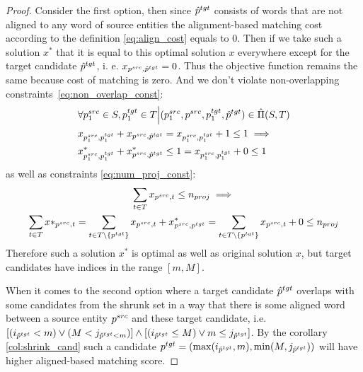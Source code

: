 \begin{proof}
    Consider the first option, then since \( \hat{p}^{tgt}  \) consists of words that are not aligned to any word
    of source entities the alignment-based matching cost according to the definition \eqref{eq:align_cost} equals to \( 0 \).
    Then if we take such a solution \( x^* \) that it is equal to this optimal solution \( x \) everywhere except
    for the target candidate \( \hat{p}^{tgt}  \), i. e. \( x_{p^{src}, \hat{p}^{tgt}} = 0 \). Thus the objective function
    remains the same because cost of matching is zero. And we don't violate non-overlapping constraints~\eqref{eq:non_overlap_const}:
    \begin{align*}
         & \forall p_1^{src} \in S, p_1^{tgt} \in T \Big| (p_1^{src}, p^{src}, p_1^{tgt}, \hat{p}^{tgt}) \in \hat{\Pi}(S, T) \\
         & x_{p_1^{src}, p_1^{tgt}} + x_{p^{src}, \hat{p}^{tgt}} =
        x_{p_1^{src}, p_1^{tgt}} + 1 \leq 1 \implies                                                                         \\
         & x^*_{p_1^{src}, p_1^{tgt}} + x^*_{p^{src}, \hat{p}^{tgt}} \leq 1 =
        x_{p_1^{src}, p_1^{tgt}} + 0 \leq 1
    \end{align*}
    as well as constraints \eqref{eq:num_proj_const}:
    \begin{multline*}
        \sum\limits_{t \in T} x_{p^{src}, t} \leq n_{proj} \implies                             \\
        \sum\limits_{t \in T} x*_{p^{src}, t} =
        \sum\limits_{t \in T \setminus \{ p^{tgt} \}} x_{p^{src}, t} + x^*_{p^{src}, p^{tgt}} =
        \sum\limits_{t \in T \setminus \{ p^{tgt} \}} x_{p^{src}, t} + 0 \leq n_{proj}
    \end{multline*}
    Therefore such a solution \( x^* \) is optimal as well as original solution \( x \), but
    target candidates have indices in the range \( [m, M] \).

    When it comes to the second option where a target candidate \( \hat{p}^{tgt} \) overlaps with some
    candidates from the shrunk set in a way that there is some aligned word between a source entity \( p^{src} \) and these target candidate, i.e.
    \( \left[ (i_{\hat{p}^{tgt}} < m) \lor (M < j_{\hat{p}^{tgt} < m}) \right] \land
    \left[ (i_{\hat{p}^{tgt}} \leq M) \lor m \leq j_{\hat{p}^{tgt}} \right] \).
    By the corollary \ref{col:shrink_cand} such a candidate \( p^{tgt} = ( \max(i_{\hat{p}^{tgt}}, m), \min(M, j_{\hat{p}^{tgt}}) ) \) will have
    higher aligned-based matching score.


\end{proof}
